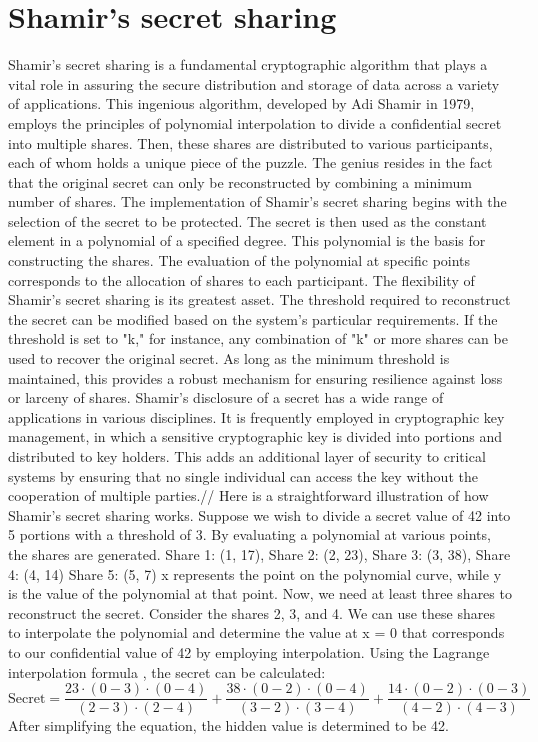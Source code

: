 \documentclass[../Main.tex]{subfiles}
\begin{document}

\section{Shamir's secret sharing}
Shamir's secret sharing is a fundamental cryptographic algorithm that plays a vital role in assuring the secure distribution and storage of data across a variety of applications. This ingenious algorithm, developed by Adi Shamir in 1979, employs the principles of polynomial interpolation to divide a confidential secret into multiple shares. Then, these shares are distributed to various participants, each of whom holds a unique piece of the puzzle. The genius resides in the fact that the original secret can only be reconstructed by combining a minimum number of shares. The implementation of Shamir's secret sharing begins with the selection of the secret to be protected. The secret is then used as the constant element in a polynomial of a specified degree. This polynomial is the basis for constructing the shares. The evaluation of the polynomial at specific points corresponds to the allocation of shares to each participant. The flexibility of Shamir's secret sharing is its greatest asset. The threshold required to reconstruct the secret can be modified based on the system's particular requirements. If the threshold is set to "k," for instance, any combination of "k" or more shares can be used to recover the original secret. As long as the minimum threshold is maintained, this provides a robust mechanism for ensuring resilience against loss or larceny of shares. Shamir's disclosure of a secret has a wide range of applications in various disciplines. It is frequently employed in cryptographic key management, in which a sensitive cryptographic key is divided into portions and distributed to key holders. This adds an additional layer of security to critical systems by ensuring that no single individual can access the key without the cooperation of multiple parties.//
\indent Here is a straightforward illustration of how Shamir's secret sharing works.
Suppose we wish to divide a secret value of 42 into 5 portions with a threshold of 3. By evaluating a polynomial at various points, the shares are generated.
Share 1: (1, 17), Share 2: (2, 23), Share 3: (3, 38), Share 4: (4, 14)
Share 5: (5, 7)
x represents the point on the polynomial curve, while y is the value of the polynomial at that point.
Now, we need at least three shares to reconstruct the secret. Consider the shares 2, 3, and 4. We can use these shares to interpolate the polynomial and determine the value at x = 0 that corresponds to our confidential value of 42 by employing interpolation.
Using the Lagrange interpolation formula \cite{larrange-interpolation}, the secret can be calculated:
\[
\text{Secret} = \frac{{23 \cdot (0 - 3) \cdot (0 - 4)}}{{(2 - 3) \cdot (2 - 4)}} +
\frac{{38 \cdot (0 - 2) \cdot (0 - 4)}}{{(3 - 2) \cdot (3 - 4)}} +
\frac{{14 \cdot (0 - 2) \cdot (0 - 3)}}{{(4 - 2) \cdot (4 - 3)}}
\]
After simplifying the equation, the hidden value is determined to be 42.
\end{document}
